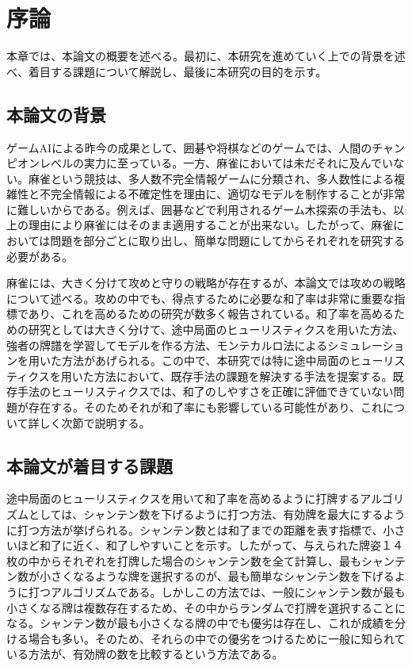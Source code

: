 \chapter{序論}
\label{chap:introduction}

本章では、本論文の概要を述べる。最初に、本研究を進めていく上での背景を述べ、着目する課題について解説し、最後に本研究の目的を示す。

\section{本論文の背景}
ゲームAIによる昨今の成果として、囲碁や将棋などのゲームでは、人間のチャンピオンレベルの実力に至っている。一方、麻雀においては未だそれに及んでいない。麻雀という競技は、多人数不完全情報ゲームに分類され、多人数性による複雑性と不完全情報による不確定性を理由に、適切なモデルを制作することが非常に難しいからである。例えば、囲碁などで利用されるゲーム木探索の手法も、以上の理由により麻雀にはそのまま適用することが出来ない。したがって、麻雀においては問題を部分ごとに取り出し、簡単な問題にしてからそれぞれを研究する必要がある。

麻雀には、大きく分けて攻めと守りの戦略が存在するが、本論文では攻めの戦略について述べる。攻めの中でも、得点するために必要な和了率は非常に重要な指標であり、これを高めるための研究が数多く報告されている。和了率を高めるための研究としては大きく分けて、途中局面のヒューリスティクスを用いた方法、強者の牌譜を学習してモデルを作る方法、モンテカルロ法によるシミュレーションを用いた方法があげられる。この中で、本研究では特に途中局面のヒューリスティクスを用いた方法において、既存手法の課題を解決する手法を提案する。既存手法のヒューリスティクスでは、和了のしやすさを正確に評価できていない問題が存在する。そのためそれが和了率にも影響している可能性があり、これについて詳しく次節で説明する。

\section{本論文が着目する課題}
途中局面のヒューリスティクスを用いて和了率を高めるように打牌するアルゴリズムとしては、シャンテン数を下げるように打つ方法、有効牌を最大にするように打つ方法が挙げられる。シャンテン数とは和了までの距離を表す指標で、小さいほど和了に近く、和了しやすいことを示す。したがって、与えられた牌姿１４枚の中からそれぞれを打牌した場合のシャンテン数を全て計算し、最もシャンテン数が小さくなるような牌を選択するのが、最も簡単なシャンテン数を下げるように打つアルゴリズムである。しかしこの方法では、一般にシャンテン数が最も小さくなる牌は複数存在するため、その中からランダムで打牌を選択することになる。シャンテン数が最も小さくなる牌の中でも優劣は存在し、これが成績を分ける場合も多い。そのため、それらの中での優劣をつけるために一般に知られている方法が、有効牌の数を比較するという方法である。

